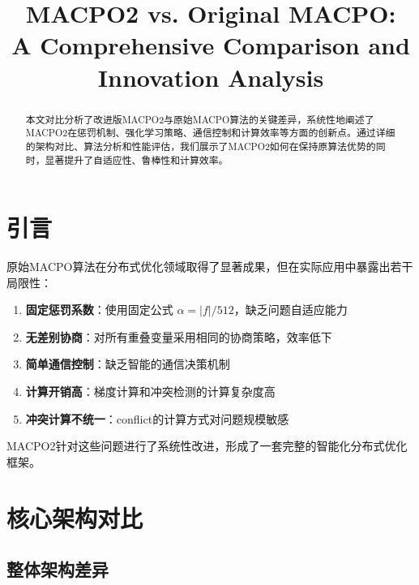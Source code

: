 \documentclass[15pt,a3paper]{ctexart}
\title{MACPO2 vs. Original MACPO: \\
A Comprehensive Comparison and Innovation Analysis}
\author{}
\date{}
\begin{document}
\maketitle

\begin{abstract}
本文对比分析了改进版MACPO2与原始MACPO算法的关键差异，系统性地阐述了MACPO2在惩罚机制、强化学习策略、通信控制和计算效率等方面的创新点。通过详细的架构对比、算法分析和性能评估，我们展示了MACPO2如何在保持原算法优势的同时，显著提升了自适应性、鲁棒性和计算效率。
\end{abstract}

\section{引言}

原始MACPO算法\cite{original_macpo}在分布式优化领域取得了显著成果，但在实际应用中暴露出若干局限性：
\begin{enumerate}
    \item \textbf{固定惩罚系数}：使用固定公式 $\alpha = |f| / 512$，缺乏问题自适应能力
    \item \textbf{无差别协商}：对所有重叠变量采用相同的协商策略，效率低下
    \item \textbf{简单通信控制}：缺乏智能的通信决策机制
    \item \textbf{计算开销高}：梯度计算和冲突检测的计算复杂度高
    \item \textbf{冲突计算不统一}：conflict的计算方式对问题规模敏感
\end{enumerate}

MACPO2针对这些问题进行了系统性改进，形成了一套完整的智能化分布式优化框架。

\section{核心架构对比}

\subsection{整体架构差异}
\end{document}
